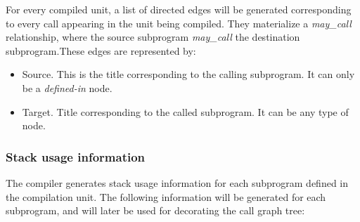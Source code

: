For every compiled unit, a list of directed edges will be generated
corresponding to every call appearing in the unit being compiled. They
materialize a {\em may\_call} relationship, where the source
subprogram {\em may\_call} the destination subprogram.These edges are
represented by:

\begin{itemize}

\item Source. This is the title corresponding to the calling
  subprogram. It can only be a \emph{defined-in} node.

\item Target. Title corresponding to the called subprogram. It can be
  any type of node.

\end{itemize}

\subsubsection{Stack usage information}
\label{compiler-stack-usage}

The compiler generates stack usage information for each subprogram
defined in the compilation unit. The following information will be
generated for each subprogram, and will later be used for decorating
the call graph tree:

